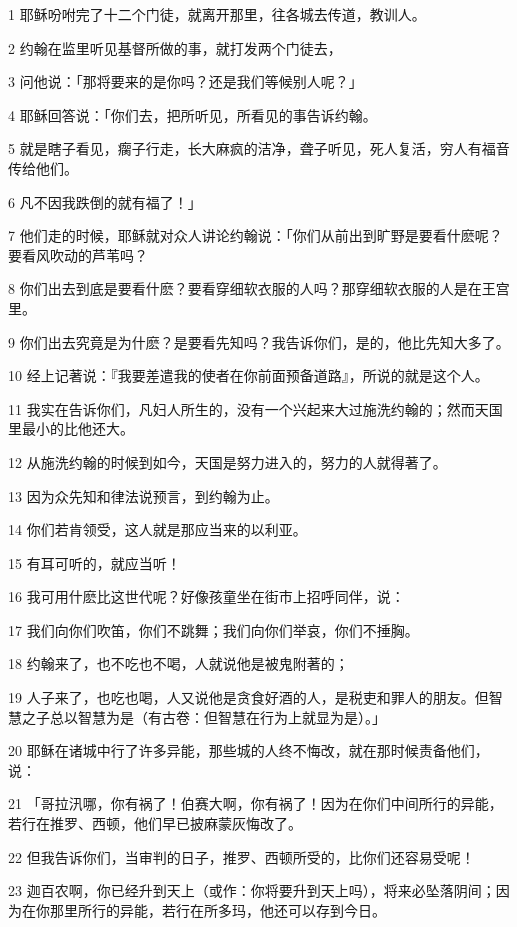 \par 1 耶稣吩咐完了十二个门徒，就离开那里，往各城去传道，教训人。
\par 2 约翰在监里听见基督所做的事，就打发两个门徒去，
\par 3 问他说：「那将要来的是你吗？还是我们等候别人呢？」
\par 4 耶稣回答说：「你们去，把所听见，所看见的事告诉约翰。
\par 5 就是瞎子看见，瘸子行走，长大麻疯的洁净，聋子听见，死人复活，穷人有福音传给他们。
\par 6 凡不因我跌倒的就有福了！」
\par 7 他们走的时候，耶稣就对众人讲论约翰说：「你们从前出到旷野是要看什麽呢？要看风吹动的芦苇吗？
\par 8 你们出去到底是要看什麽？要看穿细软衣服的人吗？那穿细软衣服的人是在王宫里。
\par 9 你们出去究竟是为什麽？是要看先知吗？我告诉你们，是的，他比先知大多了。
\par 10 经上记著说：『我要差遣我的使者在你前面预备道路』，所说的就是这个人。
\par 11 我实在告诉你们，凡妇人所生的，没有一个兴起来大过施洗约翰的；然而天国里最小的比他还大。
\par 12 从施洗约翰的时候到如今，天国是努力进入的，努力的人就得著了。
\par 13 因为众先知和律法说预言，到约翰为止。
\par 14 你们若肯领受，这人就是那应当来的以利亚。
\par 15 有耳可听的，就应当听！
\par 16 我可用什麽比这世代呢？好像孩童坐在街市上招呼同伴，说：
\par 17 我们向你们吹笛，你们不跳舞；我们向你们举哀，你们不捶胸。
\par 18 约翰来了，也不吃也不喝，人就说他是被鬼附著的；
\par 19 人子来了，也吃也喝，人又说他是贪食好酒的人，是税吏和罪人的朋友。但智慧之子总以智慧为是（有古卷：但智慧在行为上就显为是）。」
\par 20 耶稣在诸城中行了许多异能，那些城的人终不悔改，就在那时候责备他们，说：
\par 21 「哥拉汛哪，你有祸了！伯赛大啊，你有祸了！因为在你们中间所行的异能，若行在推罗、西顿，他们早已披麻蒙灰悔改了。
\par 22 但我告诉你们，当审判的日子，推罗、西顿所受的，比你们还容易受呢！
\par 23 迦百农啊，你已经升到天上（或作：你将要升到天上吗），将来必坠落阴间；因为在你那里所行的异能，若行在所多玛，他还可以存到今日。
